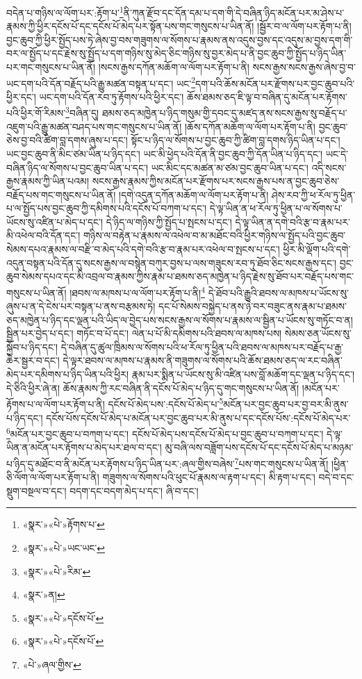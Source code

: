 བདེན་པ་གཉིས་ལ་ལོག་པར་:རྟོག་པ་\footnote{«སྣར་»«པེ་»རྟོགས་པ་}ནི་ཀུན་རྫོབ་དང་དོན་དམ་པ་དག་གི་དེ་བཞིན་ཉིད་མངོན་པར་མ་ཤེས་པ་རྣམས་ཀྱི་ཕྱིར་དངོས་པོ་དང་དངོས་པོ་མེད་པར་སྟོན་པས་གང་གསུངས་པ་ཡིན་ནོ། །སྦྱོར་བ་ལ་ལོག་པར་རྟོག་པ་ནི། བྱང་ཆུབ་ཀྱི་ཕྱིར་སྤྱོད་པས་ཏེ་ཞེས་བྱ་བས་གཟུགས་ལ་སོགས་པ་རྣམས་ནས་འདུས་བྱས་དང་འདུས་མ་བྱས་དག་གི་བར་ལ་སྤྱོད་པ་དང་རྗེས་སུ་སྤྱོད་པ་དག་གཉིས་སུ་མེད་ཅིང་གཉིས་སུ་བྱར་མེད་པ་ནི་བྱང་ཆུབ་ཀྱི་སྤྱོད་པ་ཉིད་ཡིན་པར་གང་གསུངས་པ་ཡིན་ནོ། །སངས་རྒྱས་དཀོན་མཆོག་ལ་ལོག་པར་རྟོག་པ་ནི། སངས་རྒྱས་སངས་རྒྱས་ཞེས་བྱ་བ་ཡང་དག་པའི་དོན་བརྗོད་པའི་རྒྱུ་མཚན་བསྟན་པ་དང་། ཡང་\footnote{«སྣར་»«པེ་»ཡང་ཡང་}དག་པའི་ཆོས་མངོན་པར་རྫོགས་པར་བྱང་ཆུབ་པའི་ཕྱིར་དང་། ཡང་དག་པའི་དོན་རབ་ཏུ་རྟོགས་པའི་ཕྱིར་དང་། ཆོས་ཐམས་ཅད་ཇི་ལྟ་བ་བཞིན་དུ་མངོན་པར་རྟོགས་པའི་ཕྱིར་གོ་རིམས་\footnote{«སྣར་»«པེ་»རིམ་}བཞིན་དུ། ཐམས་ཅད་མཁྱེན་པ་ཉིད་གསུམ་གྱི་དབང་དུ་མཛད་ནས་སངས་རྒྱས་སུ་བརྗོད་པ་འཇུག་པའི་རྒྱུ་མཚན་བཤད་པས་གང་གསུངས་པ་ཡིན་ནོ། །ཆོས་དཀོན་མཆོག་ལ་ལོག་པར་རྟོག་པ་ནི། བྱང་ཆུབ་ཅེས་བྱ་བའི་ཚིག་བླ་དགས་ཞུས་པ་དང་། སྟོང་པ་ཉིད་ལ་སོགས་པ་བྱང་ཆུབ་ཀྱི་ཚིག་བླ་དགས་ཉིད་ཡིན་པ་དང་། ཡང་བྱང་ཆུབ་ནི་མིང་ཙམ་ཡིན་པ་ཉིད་དང་། ཡང་མི་ཕྱེད་པའི་དོན་ནི་བྱང་ཆུབ་ཀྱི་དོན་ཡིན་པ་ཉིད་དང་། ཡང་དེ་བཞིན་ཉིད་ལ་སོགས་པ་བྱང་ཆུབ་ཡིན་པ་དང་། ཡང་མིང་དང་མཚན་མ་ཙམ་བྱང་ཆུབ་ཡིན་པ་དང་། འདི་སངས་རྒྱས་རྣམས་ཀྱི་ཡིན་པའམ། སངས་རྒྱས་རྣམས་ཀྱིས་མངོན་པར་རྫོགས་པར་སངས་རྒྱས་པས་ན་བྱང་ཆུབ་ཅེས་བརྗོད་པས་གང་གསུངས་པ་ཡིན་ནོ། །དགེ་འདུན་དཀོན་མཆོག་ལ་ལོག་པར་རྟོག་པ་ནི། ཤེས་རབ་ཀྱི་ཕ་རོལ་ཏུ་ཕྱིན་པ་ལ་སྤྱོད་པས་བྱང་ཆུབ་ཀྱི་དམིགས་པའི་དངོས་པོ་བཀག་པ་དང་། དེ་ལྟ་ཡིན་ན་ཕ་རོལ་ཏུ་ཕྱིན་པ་ལ་སོགས་པ་ཡོངས་སུ་འཛིན་པ་མེད་པ་དང་། དེ་ཉིད་ལ་གཉིས་ཀྱི་སྤྱོད་པ་སྤངས་པ་དང་། དེ་ལྟ་ཡིན་ན་དགེ་བའི་རྩ་བ་རྣམ་པར་མི་འཕེལ་བའི་དོན་དང་། གཉིས་ལ་བརྟེན་པ་རྣམས་ལ་འཕེལ་བ་མ་མཐོང་བའི་ཕྱིར་གཉིས་ལ་སྤྱོད་པའི་བྱང་ཆུབ་སེམས་དཔའ་རྣམས་ལ་བརྫི་བ་མེད་པའི་དགེ་བའི་རྩ་བ་རྣམ་པར་འཕེལ་བ་སྤངས་པ་དང་། ཕྱིར་མི་ལྡོག་པའི་དགེ་འདུན་བསྟན་པའི་དོན་དུ་སངས་རྒྱས་ལ་བསྙེན་བཀུར་བྱས་པ་ལས་གཟུངས་རབ་ཏུ་ཐོབ་ཅིང་སངས་རྒྱས་དང་། བྱང་ཆུབ་སེམས་དཔའ་དང་མི་འབྲལ་བ་རྣམས་ཀྱིས་རྣམ་པ་ཐམས་ཅད་མཁྱེན་པ་ཉིད་རྗེས་སུ་ཐོབ་པར་བརྗོད་པས་གང་གསུངས་པ་ཡིན་ནོ། །ཐབས་ལ་མཁས་པ་ལ་ལོག་པར་རྟོག་པ་ནི།\footnote{«སྣར་»ན།} དེ་ཐོབ་པའི་རྒྱུའི་ཐབས་ལ་མཁས་པ་ཡོངས་སུ་ཞུས་པ་ན་དེ་ངེས་པར་བསྟན་པ་ནས་བརྩམས་ཏེ། དང་པོ་སེམས་བསྐྱེད་པ་ནས་ཉེ་བར་བཟུང་ནས་རྣམ་པ་ཐམས་ཅད་མཁྱེན་པ་ཉིད་དང་ལྡན་པའི་ཡིད་ལ་བྱེད་པས་སངས་རྒྱས་ལ་སོགས་པ་རྣམས་ལ་སྦྱིན་པ་ཡོངས་སུ་གཏོང་བ་ན། སྦྱིན་པར་བྱེད་པ་དང་། གཏོང་བ་པོ་དང་། ལེན་པ་པོ་མི་དམིགས་པའི་ཐབས་ལ་མཁས་པས། སེམས་ཅན་ཡོངས་སུ་སྐྱོབ་པ་ཉིད་དང་། དེ་བཞིན་དུ་ཚུལ་ཁྲིམས་ལ་སོགས་པའི་ཕ་རོལ་ཏུ་ཕྱིན་པའི་ཐབས་ལ་མཁས་པར་བརྗོད་པ་རྒྱ་ཆེར་སྦྱར་བ་དང་། དེ་ལྟར་ཐབས་ལ་མཁས་པ་རྣམས་ནི་གཟུགས་ལ་སོགས་པའི་ཆོས་ཐམས་ཅད་ལ་རང་བཞིན་མེད་པར་དམིགས་པ་ཉིད་ཡིན་པའི་ཕྱིར། རྣམ་པར་སྨིན་པ་ཡོངས་སུ་མི་འཛིན་པས་བློ་མཆོག་དང་ལྡན་པ་ཉིད་དང་། དེ་ཅིའི་ཕྱིར་ཞེ་ན། ཆོས་རྣམས་ཀྱི་རང་བཞིན་ནི་དངོས་པོ་མེད་པ་ཉིད་དུ་གང་གསུངས་པ་ཡིན་ནོ། །མངོན་པར་རྟོགས་པ་ལ་ལོག་པར་རྟོག་པ་ནི། དངོས་པོ་མེད་པས་:དངོས་པོ་མེད་པ་\footnote{«སྣར་»«པེ་»དངོས་པོ་}མངོན་པར་བྱང་ཆུབ་པར་བྱ་བར་མི་ནུས་པ་ཉིད་དང་། དངོས་པོས་དངོས་པོ་མེད་པ་མངོན་པར་བྱང་ཆུབ་པར་མི་ནུས་པ་དང་དངོས་པོས་:དངོས་པོ་མེད་པར་\footnote{«སྣར་»«པེ་»དངོས་པོ་}མངོན་པར་བྱང་ཆུབ་པ་བཀག་པ་དང་། དངོས་པོ་མེད་པས་དངོས་པོ་མེད་པ་བྱང་ཆུབ་པ་བཀག་པ་དང་། དེ་ལྟ་ཡིན་ན་མངོན་པར་རྟོགས་པ་མེད་པར་ཐལ་བ་དང་། མུ་བཞི་ལས་བཟློག་པས་དངོས་པོ་དང་དངོས་པོ་མེད་པ་མཉམ་པ་ཉིད་དུ་མཐོང་བ་ནི་མངོན་པར་རྟོགས་པ་ཉིད་ཡིན་པར་:ཞལ་གྱིས་བཞེས་\footnote{«པེ་»ཞལ་གྱིས་}པས་གང་གསུངས་པ་ཡིན་ནོ། །ཕྱིན་ཅི་ལོག་ལ་ལོག་པར་རྟོག་པ་ནི། གཟུགས་ལ་སོགས་པའི་ཕུང་པོ་རྣམས་ལ་རྟག་པ་དང་། མི་རྟག་པ་དང་། བདེ་བ་དང་སྡུག་བསྔལ་བ་དང་། བདག་དང་བདག་མེད་པ་དང་། ཞི་བ་དང་། 